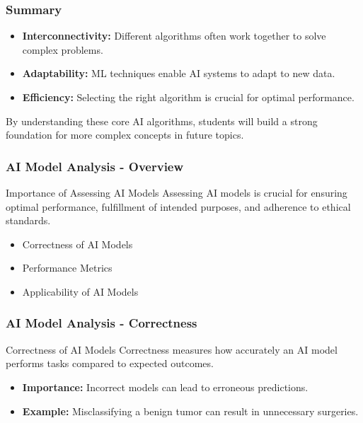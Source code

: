 \documentclass[aspectratio=169]{beamer}
\begin{document}
\begin{frame}[fragile]
  \frametitle{Summary}
  \begin{itemize}
    \item \textbf{Interconnectivity:} Different algorithms often work together to solve complex problems.
    \item \textbf{Adaptability:} ML techniques enable AI systems to adapt to new data.
    \item \textbf{Efficiency:} Selecting the right algorithm is crucial for optimal performance.
  \end{itemize}
  
  By understanding these core AI algorithms, students will build a strong foundation for more complex concepts in future topics.
\end{frame}

\begin{frame}[fragile]
    \frametitle{AI Model Analysis - Overview}
    \begin{block}{Importance of Assessing AI Models}
        Assessing AI models is crucial for ensuring optimal performance, fulfillment of intended purposes, and adherence to ethical standards.
    \end{block}
    \begin{itemize}
        \item Correctness of AI Models
        \item Performance Metrics
        \item Applicability of AI Models
    \end{itemize}
\end{frame}

\begin{frame}[fragile]
    \frametitle{AI Model Analysis - Correctness}
    \begin{block}{Correctness of AI Models}
        Correctness measures how accurately an AI model performs tasks compared to expected outcomes.
    \end{block}
    \begin{itemize}
        \item \textbf{Importance:} Incorrect models can lead to erroneous predictions.
        \item \textbf{Example:} Misclassifying a benign tumor can result in unnecessary surgeries.
    \end{itemize}
\end{frame}
\end{document}
